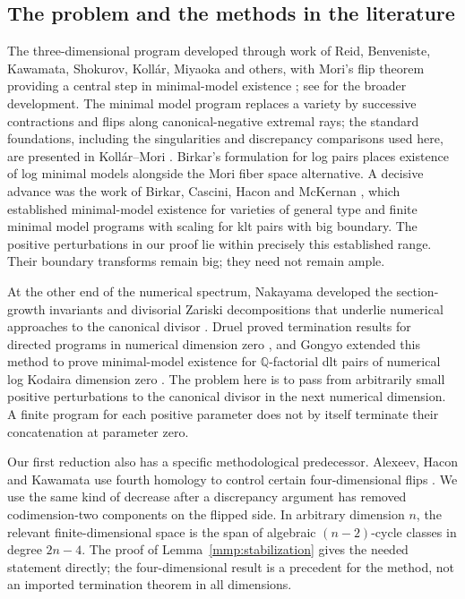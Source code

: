\subsection{The problem and the methods in the literature}

The three-dimensional program developed through work of Reid, Benveniste,
Kawamata, Shokurov, Koll\'ar, Miyaoka and others, with Mori's flip theorem
providing a central step in minimal-model existence \cite{Mori88};
see \cite{KM98} for the broader development.
The minimal model program replaces a variety by successive contractions
and flips along canonical-negative extremal rays; the standard foundations,
including the singularities and discrepancy comparisons used here, are
presented in Koll\'ar--Mori \cite{KM98}. Birkar's formulation for log pairs
\cite[Conjecture~1.1]{Birkar10} places existence of log minimal models
alongside the Mori fiber space alternative. A decisive advance was the work
of Birkar, Cascini, Hacon and McKernan \cite{BCHM10}, which established
minimal-model existence for varieties of general type and finite minimal
model programs with scaling for klt pairs with big boundary. The positive
perturbations in our proof lie within precisely this established range.
Their boundary transforms remain big; they need not remain ample.

At the other end of the numerical spectrum, Nakayama developed the
section-growth invariants and divisorial Zariski decompositions that underlie
numerical approaches to the canonical divisor \cite{Nak04}. Druel proved
termination results for directed programs in numerical dimension zero
\cite[Corollary~3.4]{Druel11}, and Gongyo extended this method to prove
minimal-model existence for \(\mathbb Q\)-factorial dlt pairs of numerical
log Kodaira dimension zero
\cite[Theorem~1.1]{Gongyo11}. The problem here is to pass
from arbitrarily small positive perturbations to the canonical divisor in
the next numerical dimension. A finite program for each positive parameter
does not by itself terminate their concatenation at parameter zero.

Our first reduction also has a specific methodological predecessor.
Alexeev, Hacon and Kawamata use fourth homology to control certain
four-dimensional flips \cite[Lemma~3.1 and its proof]{AHK07}. We use the
same kind of decrease after a discrepancy argument has removed
codimension-two components on the flipped side. In arbitrary dimension
\(n\), the relevant finite-dimensional space is the span of algebraic
\((n-2)\)-cycle classes in degree \(2n-4\). The proof of
Lemma~\ref{mmp:stabilization} gives the needed statement directly; the
four-dimensional result is a precedent for the method, not an imported
termination theorem in all dimensions.


